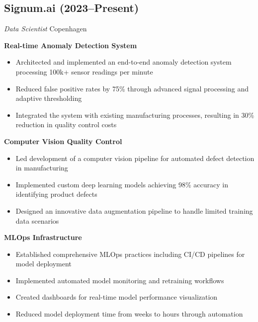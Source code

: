 \subsection*{Signum.ai (2023--Present)}
\label{sec:raysearch}
\textit{Data Scientist} \hfill Copenhagen

\textbf{Real-time Anomaly Detection System}
\begin{itemize}
\item Architected and implemented an end-to-end anomaly detection system processing 100k+ sensor readings per minute
\item Reduced false positive rates by 75\% through advanced signal processing and adaptive thresholding
\item Integrated the system with existing manufacturing processes, resulting in 30\% reduction in quality control costs
\end{itemize}

\textbf{Computer Vision Quality Control}
\begin{itemize}
\item Led development of a computer vision pipeline for automated defect detection in manufacturing
\item Implemented custom deep learning models achieving 98\% accuracy in identifying product defects
\item Designed an innovative data augmentation pipeline to handle limited training data scenarios
\end{itemize}

\textbf{MLOps Infrastructure}
\begin{itemize}
\item Established comprehensive MLOps practices including CI/CD pipelines for model deployment
\item Implemented automated model monitoring and retraining workflows
\item Created dashboards for real-time model performance visualization
\item Reduced model deployment time from weeks to hours through automation
\end{itemize}